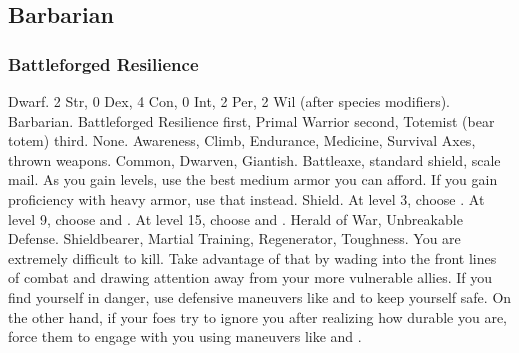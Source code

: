     \subsection{Barbarian}

        \subsubsection{Battleforged Resilience}
             Dwarf.
             2 Str, 0 Dex, 4 Con, 0 Int, 2 Per, 2 Wil (after species modifiers).
             Barbarian.
             Battleforged Resilience first, Primal Warrior second, Totemist (bear totem) third.
             None.
             Awareness, Climb, Endurance, Medicine, Survival
             Axes, thrown weapons.
             Common, Dwarven, Giantish.
             Battleaxe, standard shield, scale mail. As you gain levels, use the best medium armor you can afford. If you gain proficiency with heavy armor, use that instead.
             Shield.
                At level 3, choose .
                At level 9, choose  and .
                At level 15, choose  and .
             Herald of War, Unbreakable Defense.
             Shieldbearer, Martial Training, Regenerator, Toughness.
             You are extremely difficult to kill.
            Take advantage of that by wading into the front lines of combat and drawing attention away from your more vulnerable allies.
            If you find yourself in danger, use defensive maneuvers like  and  to keep yourself safe.
            On the other hand, if your foes try to ignore you after realizing how durable you are, force them to engage with you using maneuvers like  and .

